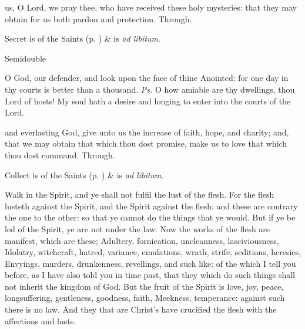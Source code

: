 \postcommunion
{} us, O Lord, we pray thee, who have received these holy mysteries: that they may obtain for us both pardon and protection. Through.
\begin{rubric}
     Secret is of the Saints (p. \pageref{SPSaints}) \&  is \emph{ad libitum}.
\end{rubric}

\begin{inhead}
{Semidouble}
\end{inhead}
\par\noindent
{}




\properantiphonfix

\introit
{} O God, our defender, and look upon the face of thine Anointed: for one day in thy courts is better than a thousand. \textit{Ps.} O how amiable are thy dwellings, thou Lord of hosts! My soul hath a desire and longing to enter into the courts of the Lord.

\collect
{} and everlasting God, give unto us the increase of faith, hope, and charity; and, that we may obtain that which thou dost promise, make us to love that which thou dost command. Through.
\begin{rubric}
     Collect is of the Saints (p. \pageref{SPSaints}) \&  is \emph{ad libitum}.
\end{rubric}

 Walk in the Spirit, and ye shall not fulfil the lust of the flesh. For the flesh lusteth against the Spirit, and the Spirit against the flesh: and these are contrary the one to the other: so that ye cannot do the things that ye would. But if ye be led of the Spirit, ye are not under the law. Now the works of the flesh are manifest, which are these; Adultery, fornication, uncleanness, lasciviousness, Idolatry, witchcraft, hatred, variance, emulations, wrath, strife, seditions, heresies, Envyings, murders, drunkenness, revellings, and such like: of the which I tell you before, as I have also told you in time past, that they which do such things shall not inherit the kingdom of God. But the fruit of the Spirit is love, joy, peace, longsuffering, gentleness, goodness, faith, Meekness, temperance: against such there is no law. And they that are Christ's have crucified the flesh with the affections and lusts.


